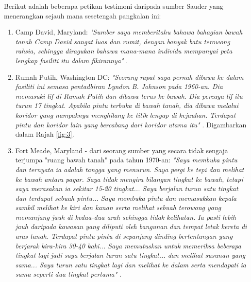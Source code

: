 \documentclass[10pt,twocolumn,letterpaper]{article}
\begin{document}
Berikut adalah beberapa petikan testimoni daripada sumber Sauder yang menerangkan sejauh mana sesetengah pangkalan ini:
\begin{flushleft}
\begin{enumerate}
    \item Camp David, Maryland: \textit{"Sumber saya memberitahu bahawa bahagian bawah tanah Camp David sangat luas dan rumit, dengan banyak batu terowong rahsia, sehingga diragukan bahawa mana-mana individu mempunyai peta lengkap fasiliti itu dalam fikirannya"} \cite{22}.
    \item Rumah Putih, Washington DC: \textit{"Seorang rapat saya pernah dibawa ke dalam fasiliti ini semasa pentadbiran Lyndon B. Johnson pada 1960-an. Dia memasuki lif di Rumah Putih dan dibawa terus ke bawah. Dia percaya lif itu turun 17 tingkat. Apabila pintu terbuka di bawah tanah, dia dibawa melalui koridor yang nampaknya menghilang ke titik lenyap di kejauhan. Terdapat pintu dan koridor lain yang bercabang dari koridor utama itu"} \cite{22}. Digambarkan dalam Rajah \ref{fig:3}.
    \item Fort Meade, Maryland - dari seorang sumber yang secara tidak sengaja terjumpa "ruang bawah tanah" pada tahun 1970-an: \textit{"Saya membuka pintu dan ternyata ia adalah tangga yang menurun. Saya pergi ke tepi dan melihat ke bawah antara pagar. Saya tidak mengira bilangan tingkat ke bawah, tetapi saya merasakan ia sekitar 15-20 tingkat... Saya berjalan turun satu tingkat dan terdapat sebuah pintu... Saya membuka pintu dan memasukkan kepala sambil melihat ke kiri dan kanan serta melihat sebuah terowong yang memanjang jauh di kedua-dua arah sehingga tidak kelihatan. Ia pasti lebih jauh daripada kawasan yang diliputi oleh bangunan dan tempat letak kereta di aras tanah. Terdapat pintu-pintu di sepanjang dinding bertentangan yang berjarak kira-kira 30-40 kaki... Saya memutuskan untuk memeriksa beberapa tingkat lagi jadi saya berjalan turun satu tingkat... dan melihat susunan yang sama... Saya turun satu tingkat lagi dan melihat ke dalam serta mendapati ia sama seperti dua tingkat pertama"} \cite{22}.
\end{enumerate}
\end{flushleft}
\end{document}
